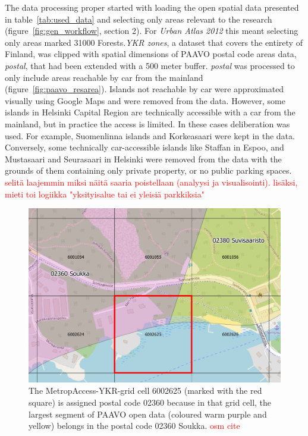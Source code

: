 The data processing proper started with loading the open spatial data presented in table~\ref{tab:used_data} and selecting only areas relevant to the research (figure~\ref{fig:gen_workflow}, section 2). For \textit{Urban Atlas 2012} this meant selecting only areas marked 31000 Forests.\textit{YKR zones}, a dataset that covers the entirety of Finland, was clipped with spatial dimensions of PAAVO postal code areas data, \textit{postal}, that had been extended with a 500 meter buffer. \textit{postal} was processed to only include areas reachable by car from the mainland (figure~\ref{fig:paavo_resarea}). Islands not reachable by car were approximated visually using Google Maps and were removed from the data. However, some islands in Helsinki Capital Region are technically accessible with a car from the mainland, but in practice the access is limited. In these cases deliberation was used. For example, Suomenlinna islands and Korkeasaari were kept in the data. Conversely, some technically car-accessible islands like Staffan in Espoo, and Mustasaari and Seurasaari in Helsinki were removed from the data with the grounds of them containing only private property, or no public parking spaces. \textcolor{red}{selitä laajemmin miksi näitä saaria poistellaan (analyysi ja visualisointi). lisäksi, mieti toi logiikka "yksityisalue tai ei yleisiä parkkiksia"}

\begin{figure}[H]%
    \includegraphics[width=\textwidth]{images/paavo-ykr.png}
    \caption[Assigning MetropAccess-YKR-grid postal codes]{The MetropAccess-YKR-grid cell 6002625 (marked with the red square) is assigned postal code 02360 because in that grid cell, the largest segment of PAAVO open data (coloured warm purple and yellow) belongs in the postal code 02360 Soukka. \textcolor{red}{osm cite}}%
    \label{fig:paavo_ykr}%
\end{figure}

